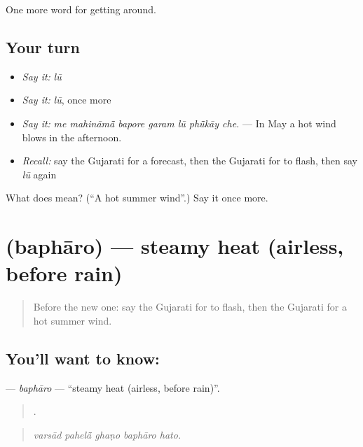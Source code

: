 \begin{grammarlens}[title={What you've built}]
One more word for getting around.
\end{grammarlens}

\subsection*{Your turn}
\begin{itemize}
\raggedright
  \item \emph{Say it:} \emph{lū}
  \item \emph{Say it:} \emph{lū}, once more
  \item \emph{Say it:} \emph{me mahināmā̃ bapore garam lū phū̃kāy che.} — In May a hot wind blows in the afternoon.
  \item \emph{Recall:} say the Gujarati for a forecast, then the Gujarati for to flash, then say \emph{lū} again
\end{itemize}

\begin{tcolorbox}[breakable,colback=teal!4,colframe=teal!35!black,title={Before you move on}]
What does  mean? (\textquotedblleft{}A hot summer wind\textquotedblright{}.) Say it once more.
\end{tcolorbox}
\section[\texorpdfstring{\gu{બફારો} (baphāro)}{બફારો (baphāro)}]{ (baphāro) — steamy heat (airless, before rain)}

\label{lesson:GU-C436-bapharo}



\begin{quote}
Before the new one: say the Gujarati for to flash, then the Gujarati for a hot summer wind.
\end{quote}

\subsection*{You'll want to know: }
\textbf{} — \emph{baphāro} — \textquotedblleft{}steamy heat (airless, before rain)\textquotedblright{}.

\begin{quote}
    .
\end{quote}

\begin{quote}
\emph{varsād pahelā̃ ghaṇo baphāro hato.}
\end{quote}

